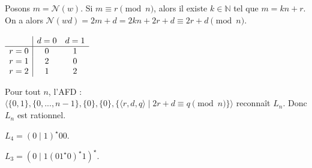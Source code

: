 \begin{corrections}

  \begin{questions}

  \item Posons $m = \mathcal{N}(w)$. Si $m\equiv r \pmod n$, alors il existe $k \in \mathbb{N}$ tel que
    $m = k n + r$. On a alors $\mathcal{N}(wd) = 2m+d = 2kn + 2r + d \equiv 2r+d \pmod n$.

  \item 
    $\begin{array}[t]{c|cc}
      &     d=0 & d=1 \\ \hline
      r=0 & 0 & 1 \\
      r=1 & 2 & 0 \\
      r=2 & 1 & 2
    \end{array}$
    
  \item 

  \item
    Pour tout $n$, l'AFD :
    $\langle \{0,1\}, \{0, ..., n-1\}, \{0\}, \{0\}, \{ \langle r, d, q \rangle \mid 2r + d \equiv q \pmod n\} \rangle$
    reconnaît $L_n$. Donc $L_n$ est rationnel.

  \item $L_4 = (0\mid 1)^\star 00$.

  \item $L_3 = (0 \mid 1 (0 1^\star 0)^\star 1)^\star$.
    
  \end{questions}

\end{corrections}

\endgroup
\endinput
